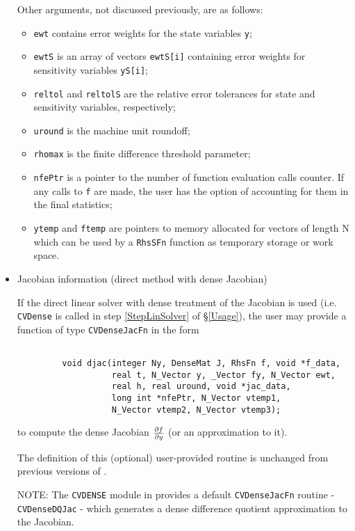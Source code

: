 \begin{itemize}
Other arguments, not discussed previously, are as follows:
\begin{itemize}
\item {\tt ewt} contains error weights for the state variables {\tt y};
\item {\tt ewtS} is an array of vectors {\tt ewtS[i]} containing
  error weights for sensitivity variables {\tt yS[i]};
\item {\tt reltol} and {\tt reltolS} are the relative error tolerances for state 
  and sensitivity variables, respectively;
\item {\tt uround} is the machine unit roundoff;
\item {\tt rhomax} is the finite difference threshold parameter;
\item {\tt nfePtr} is a pointer to the number of function evaluation
  calls counter. If any calls to {\tt f} are made, the user has the 
  option of accounting for them in the final {\codeS} statistics;
\item {\tt ytemp} and {\tt ftemp} are pointers to memory allocated
  for vectors of length N which can be used by a {\tt RhsSFn} function
  as temporary storage or work space.
\end{itemize}

\item Jacobian information (direct method with dense Jacobian)

If the direct linear solver with dense treatment of the Jacobian is used 
(i.e. {\tt CVDense} is called in step \ref{StepLinSolver} of \S\ref{Usage}), 
the user may provide a function of type {\tt CVDenseJacFn} in the form
\begin{verbatim}

         void djac(integer Ny, DenseMat J, RhsFn f, void *f_data, 
                   real t, N_Vector y, _Vector fy, N_Vector ewt,
                   real h, real uround, void *jac_data,
                   long int *nfePtr, N_Vector vtemp1,
                   N_Vector vtemp2, N_Vector vtemp3);

\end{verbatim}
to compute the dense Jacobian $\frac{\partial f}{\partial y}$ (or an approximation to it).

The definition of this (optional) user-provided routine is unchanged from
previous versions of {\code}.

NOTE: The {\tt CVDENSE} module in {\codeS} provides a default 
{\tt CVDenseJacFn} routine - {\tt CVDenseDQJac} - which generates a dense
difference quotient approximation to the Jacobian.


\end{itemize}
